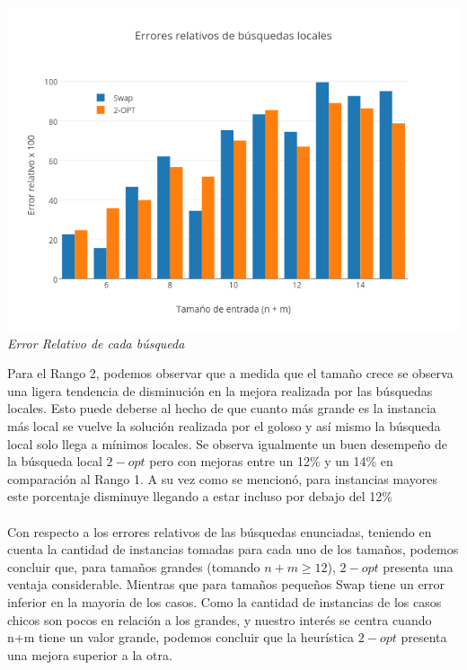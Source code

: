   \vspace*{0.3cm} \vspace*{0.3cm}
  \begin{center}
	\includegraphics[scale=0.50]{./EJ3/randomError.png}
	\label{fig:randomError}	
	\\{\textit{Error Relativo de cada búsqueda}}
  \end{center}
  \vspace*{0.3cm} 


Para el Rango 2, podemos observar que a medida que el tamaño crece se observa una ligera tendencia de disminución en la mejora realizada por las búsquedas locales. Esto puede deberse al hecho de que cuanto más grande es la instancia más local se vuelve la solución realizada por el goloso y así mismo la búsqueda local solo llega a mínimos locales. Se observa igualmente un buen desempeño de la búsqueda local $2-opt$ pero con mejoras entre un 12\% y un 14\% en comparación al Rango 1. A su vez como se mencionó, para instancias mayores este porcentaje disminuye llegando a estar incluso por debajo del 12\%
\\\\
 
 Con respecto a los errores relativos de las búsquedas enunciadas, teniendo en cuenta la cantidad de instancias tomadas para cada uno de los tamaños, podemos concluir que, para tamaños grandes (tomando $n+m \geq 12$), $2-opt$ presenta una ventaja considerable. Mientras que para tamaños pequeños Swap tiene un error inferior en la mayoria de los casos. Como la cantidad de instancias de los casos chicos son pocos en relaci\'on a los grandes, y nuestro inter\'es se centra cuando n+m tiene un valor grande, podemos concluir que la heurística $2-opt$ presenta una mejora superior a la otra.
\newpage
